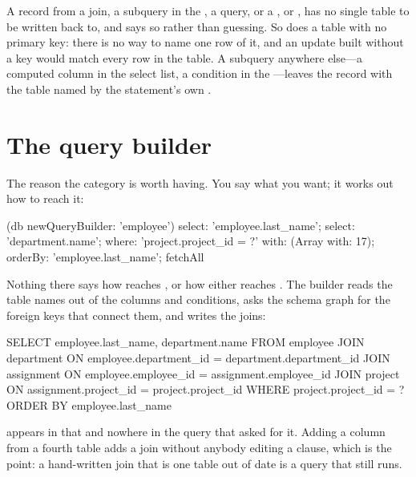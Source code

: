 A record from a join, a subquery in the , a  query, or
a ,  or , has no single table to be
written back to, and says so rather than guessing. So does a table with no
primary key: there is no way to name one row of it, and an update built without
a key would match every row in the table. A subquery anywhere else---a computed
column in the select list, a condition in the ---leaves the record
with the table named by the statement's own .

\section{The query builder}

The reason the category is worth having. You say what you want; it works out
how to reach it:

\begin{st}
(db newQueryBuilder: 'employee')
    select: 'employee.last_name';
    select: 'department.name';
    where: 'project.project_id = ?' with: (Array with: 17);
    orderBy: 'employee.last_name';
    fetchAll
\end{st}

Nothing there says how  reaches , or how either
reaches . The builder reads the table names out of the columns
and conditions, asks the schema graph for the foreign keys that connect them,
and writes the joins:

\begin{plain}
SELECT employee.last_name, department.name FROM employee
  JOIN department ON employee.department_id = department.department_id
  JOIN assignment ON employee.employee_id = assignment.employee_id
  JOIN project ON assignment.project_id = project.project_id
 WHERE project.project_id = ? ORDER BY employee.last_name
\end{plain}

 appears in that and nowhere in the query that asked for it.
Adding a column from a fourth table adds a join without anybody editing a
 clause, which is the point: a hand-written join that is one table
out of date is a query that still runs.

